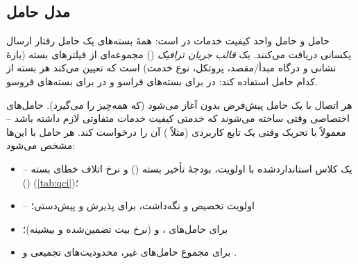 \documentclass[11pt,a4paper]{article}
\begin{document}
\subsection{مدل حامل}
\begin{definitionbox}{حامل  و }
حامل  واحد کیفیت خدمات در  است: همهٔ بسته‌های یک حامل رفتار ارسال یکسانی دریافت می‌کنند. یک
\emph{قالب جریان ترافیک} () مجموعه‌ای از فیلترهای بسته (بازهٔ نشانی و درگاه مبدأ/مقصد، پروتکل، نوع خدمت)
است که تعیین می‌کند هر بسته از کدام حامل استفاده کند: \emph{} در  برای بسته‌های فراسو و
\emph{} در  برای بسته‌های فروسو.
\end{definitionbox}
هر اتصال  با یک حامل پیش‌فرض بدون  آغاز می‌شود (که همه‌چیز را می‌گیرد). حامل‌های اختصاصی وقتی
ساخته می‌شوند که خدمتی کیفیت خدمات متفاوتی لازم داشته باشد -- معمولاً با تحریک  وقتی یک تابع کاربردی (مثلاً
) آن را درخواست کند. هر حامل با این‌ها مشخص می‌شود:
\begin{itemize}
  \item \textbf{} -- یک کلاس استانداردشده با اولویت، بودجهٔ تأخیر بسته () و نرخ اتلاف خطای بسته
        () (\cref{tab:qci})؛
  \item \textbf{} -- اولویت تخصیص و نگه‌داشت، برای پذیرش و پیش‌دستی؛
  \item برای حامل‌های ، \textbf{} و \textbf{} (نرخ بیت تضمین‌شده و بیشینه)؛
  \item برای مجموع حامل‌های غیر، محدودیت‌های تجمیعی \textbf{} و \textbf{}.
\end{itemize}
\end{document}
